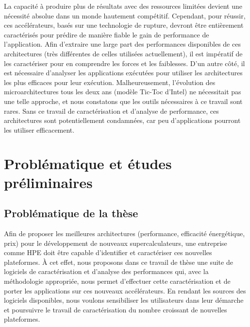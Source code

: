     
        La capacité à produire plus de résultats avec des ressources limitées devient une nécessité absolue dans un monde hautement compétitif. Cependant, pour réussir, ces accélérateurs, basés sur une technologie de rupture, devront être entièrement caractérisés pour prédire de manière fiable le gain de performance de l'application. Afin d'extraire une large part des performances disponibles de ces architectures (très différentes de celles utilisées actuellement), il est impératif de les caractériser pour en comprendre les forces et les faiblesses. D'un autre côté, il est nécessaire d'analyser les applications exécutées pour utiliser les architectures les plus efficaces pour leur exécution. Malheureusement, l'évolution des microarchitectures tous les deux ans (modèle Tic-Toc d'Intel) ne nécessitait pas une telle approche, et nous constatons que les outils nécessaires à ce travail sont rares. Sans ce travail de caractérisation et d'analyse de performance, ces architectures sont potentiellement condamnées, car peu d'applications pourront les utiliser efficacement.
      
         
         

\section{Problématique et études préliminaires}
         
         
    \subsection{Problématique de la thèse}
    
        Afin de proposer les meilleures architectures (performance, efficacité énergétique, prix) pour le développement de nouveaux supercalculateurs, une entreprise comme HPE doit être capable d'identifier et caractériser ces nouvelles plateformes. À cet effet, nous proposons dans ce travail de thèse une suite de logiciels de caractérisation et d'analyse des performances qui, avec la méthodologie appropriée, nous permet d'effectuer cette caractérisation et de porter les applications sur ces nouveaux accélérateurs. En rendant les sources des logiciels disponibles, nous voulons sensibiliser les utilisateurs dans leur démarche et poursuivre le travail de caractérisation du nombre croissant de nouvelles plateformes. 
 

